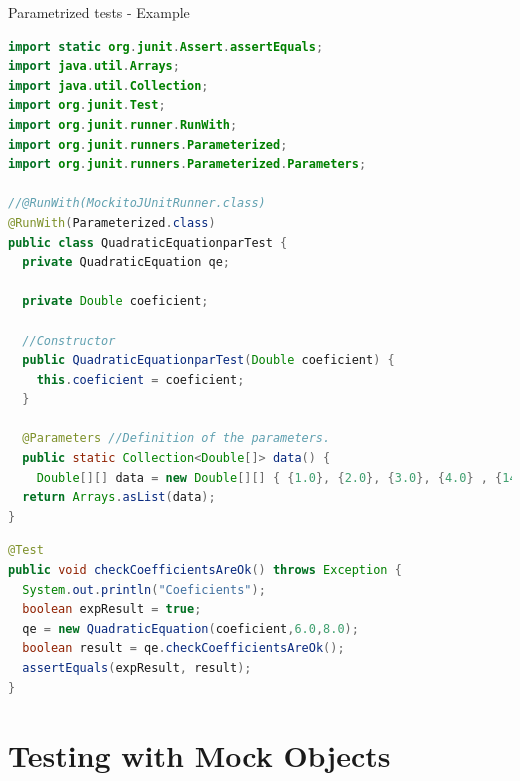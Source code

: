\documentclass[11pt, xcolor=svgnames]{beamer}
\begin{document}
\begin{frame}[fragile]{Parametrized tests - Example}

\begin{lstlisting}[language=Java,basicstyle=\tiny]
import static org.junit.Assert.assertEquals;
import java.util.Arrays;
import java.util.Collection;
import org.junit.Test;
import org.junit.runner.RunWith;
import org.junit.runners.Parameterized;
import org.junit.runners.Parameterized.Parameters;

//@RunWith(MockitoJUnitRunner.class)
@RunWith(Parameterized.class)
public class QuadraticEquationparTest {
  private QuadraticEquation qe;

  private Double coeficient;

  //Constructor
  public QuadraticEquationparTest(Double coeficient) {
    this.coeficient = coeficient;
  }

  @Parameters //Definition of the parameters.
  public static Collection<Double[]> data() {
    Double[][] data = new Double[][] { {1.0}, {2.0}, {3.0}, {4.0} , {14.0} };
  return Arrays.asList(data);
}
\end{lstlisting}
\end{frame}



\begin{frame}[fragile]
\begin{lstlisting}[language=Java,basicstyle=\tiny]
@Test
public void checkCoefficientsAreOk() throws Exception {
  System.out.println("Coeficients");
  boolean expResult = true;
  qe = new QuadraticEquation(coeficient,6.0,8.0);
  boolean result = qe.checkCoefficientsAreOk();
  assertEquals(expResult, result);
}
\end{lstlisting}
\end{frame}




\section{Testing with Mock Objects}

\end{document}

